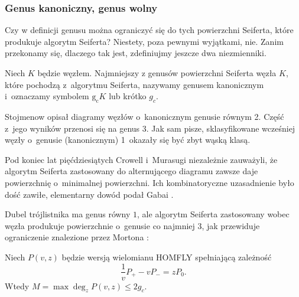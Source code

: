 
\subsubsection{Genus kanoniczny, genus wolny}
Czy w definicji genusu można ograniczyć się do tych powierzchni Seiferta, które produkuje algorytm Seiferta?
%
Niestety, poza pewnymi wyjątkami, nie.
Zanim przekonamy się, dlaczego tak jest, zdefiniujmy jeszcze dwa niezmienniki.

\begin{definition}
%
    Niech $K$ będzie węzłem.
    Najmniejszy z genusów powierzchni Seiferta węzła $K$, które pochodzą z~algorytmu Seiferta, nazywamy genusem kanonicznym i~oznaczamy symbolem $\operatorname{g_c} K$ lub krótko $g_c$.
\end{definition}

Stojmenow \cite{stoimenow2008} opisał diagramy węzłów o~kanonicznym genusie równym 2.
%
Część z~jego wyników przenosi się na genus 3.
Jak sam pisze, sklasyfikowane wcześniej węzły o~genusie (kanonicznym) 1~okazały się być zbyt wąską klasą.

Pod koniec lat pięćdziesiątych Crowell i~Murasugi niezależnie zauważyli, że algorytm Seiferta zastosowany do alternującego diagramu zawsze daje powierzchnię o~minimalnej powierzchni.
%
%
Ich kombinatoryczne uzasadnienie było dość zawiłe, elementarny dowód podał Gabai \cite{gabai1986}.
%

Dubel trójlistnika ma genus równy $1$, ale algorytm Seiferta zastosowany wobec węzła produkuje powierzchnie o~genusie co najmniej $3$, jak przewiduje ograniczenie znalezione przez Mortona \cite[twierdzenie 2]{morton1986}:
%

\begin{proposition}
    Niech $P(v, z)$ będzie wersją wielomianu HOMFLY spełniającą zależność
    \begin{equation}
        \frac 1v P_+ - vP_- = zP_0.
    \end{equation}
    Wtedy $M = \max \deg_z P(v, z) \le 2g_c$.
%
\end{proposition}

